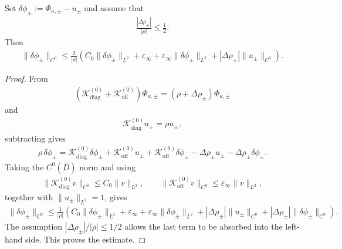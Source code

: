 \documentclass[10pt,a4paper]{amsart}
\begin{document}
\begin{proposition}
\label{prop:directC0_deg}
Set $\delta\phi_\pm := \Phi_{\kappa,\pm}-u_\pm$ and assume that
\begin{align*}
    \frac{|\Delta\rho_\pm|}{|\rho|}
    \leq
    \frac12.
\end{align*}
Then
\begin{align*}
    \|\delta\phi_\pm\|_{C^0}
    \leq
    \frac{2}{|\rho|}
    \left(
    C_0\|\delta\phi_\pm\|_{L^2}
    +
    \varepsilon_\infty
    +
    \varepsilon_\infty\|\delta\phi_\pm\|_{L^2}
    +
    |\Delta\rho_\pm|\|u_\pm\|_{C^0}
    \right).
\end{align*}
\end{proposition}

\begin{proof}
From
\begin{align*}
    (\mathcal{K}_{\mathrm{diag}}^{(0)}+\mathcal{K}_{\mathrm{off}}^{(0)})\Phi_{\kappa,\pm}
    =
    (\rho+\Delta\rho_\pm)\Phi_{\kappa,\pm}
\end{align*}
and
\begin{align*}
    \mathcal{K}_{\mathrm{diag}}^{(0)}u_\pm=\rho u_\pm,
\end{align*}
subtracting gives
\begin{align*}
    \rho\,\delta\phi_\pm
    =
    \mathcal{K}_{\mathrm{diag}}^{(0)}\delta\phi_\pm
    +
    \mathcal{K}_{\mathrm{off}}^{(0)}u_\pm
    +
    \mathcal{K}_{\mathrm{off}}^{(0)}\delta\phi_\pm
    -
    \Delta\rho_\pm u_\pm
    -
    \Delta\rho_\pm\delta\phi_\pm.
\end{align*}
Taking the $C^0(\overline D)$ norm and using
\begin{align*}
    \|\mathcal{K}_{\mathrm{diag}}^{(0)}v\|_{C^0}
    \leq
    C_0\|v\|_{L^2},
    \qquad
    \|\mathcal{K}_{\mathrm{off}}^{(0)}v\|_{C^0}
    \leq
    \varepsilon_\infty\|v\|_{L^2},
\end{align*}
together with $\|u_\pm\|_{L^2}=1$, gives
\begin{align*}
    \|\delta\phi_\pm\|_{C^0}
    \leq
    \frac{1}{|\rho|}
    \left(
    C_0\|\delta\phi_\pm\|_{L^2}
    +
    \varepsilon_\infty
    +
    \varepsilon_\infty\|\delta\phi_\pm\|_{L^2}
    +
    |\Delta\rho_\pm|\|u_\pm\|_{C^0}
    +
    |\Delta\rho_\pm|\|\delta\phi_\pm\|_{C^0}
    \right).
\end{align*}
The assumption $|\Delta\rho_\pm|/|\rho|\leq 1/2$ allows the last term to be absorbed into the left-hand side. This proves the estimate.
\end{proof}
\end{document}

